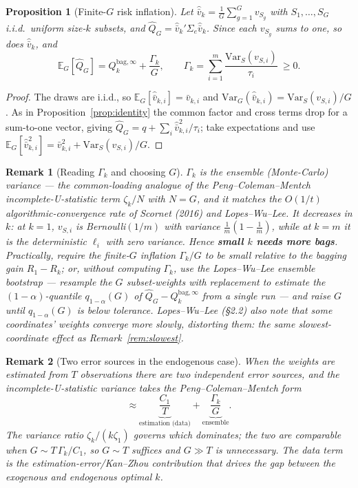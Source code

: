 \documentclass[11pt]{article}
\newcommand{\Sig}{\Sigma_e}
\newcommand{\E}{\mathbb{E}}
\newcommand{\Var}{\mathrm{Var}}
\newtheorem{proposition}{Proposition}
\newtheorem{remark}{Remark}
\begin{document}
\begin{proposition}[Finite-$G$ risk inflation]\label{prop:finiteG}
Let $\hat{\bar v}_k=\frac1G\sum_{g=1}^G v_{S_g}$ with $S_1,\dots,S_G$ i.i.d.\ uniform
size-$k$ subsets, and $\hat Q_G=\hat{\bar v}_k'\Sig\hat{\bar v}_k$. Since each $v_{S_g}$
sums to one, so does $\hat{\bar v}_k$, and
\[
  \E_G[\hat Q_G]=Q_k^{\mathrm{bag},\infty}+\frac{\Gamma_k}{G},\qquad
  \Gamma_k=\sum_{i=1}^m\frac{\Var_S(v_{S,i})}{\tau_i}\ \ge0 .
\]
\end{proposition}
\begin{proof}
The draws are i.i.d., so $\E_G[\hat{\bar v}_{k,i}]=\bar v_{k,i}$ and
$\Var_G(\hat{\bar v}_{k,i})=\Var_S(v_{S,i})/G$. As in
Proposition~\ref{prop:identity} the common factor and cross terms drop for a sum-to-one
vector, giving $\hat Q_G=q+\sum_i\hat{\bar v}_{k,i}^2/\tau_i$; take expectations and use
$\E_G[\hat{\bar v}_{k,i}^2]=\bar v_{k,i}^2+\Var_S(v_{S,i})/G$.
\end{proof}

\begin{remark}[Reading $\Gamma_k$ and choosing $G$]\label{rem:G}
$\Gamma_k$ is the ensemble (Monte-Carlo) variance --- the common-loading analogue of the
Peng--Coleman--Mentch incomplete-U-statistic term $\zeta_k/N$ with $N=G$, and it matches
the $O(1/t)$ algorithmic-convergence rate of Scornet (2016) and Lopes--Wu--Lee. It
\emph{decreases in $k$}: at $k=1$, $v_{S,i}$ is Bernoulli$(1/m)$ with variance
$\tfrac1m(1-\tfrac1m)$, while at $k=m$ it is the deterministic $\ell_i$ with zero variance.
Hence \textbf{small $k$ needs more bags}. Practically, require the finite-$G$ inflation
$\Gamma_k/G$ to be small relative to the bagging gain $R_1-R_k$; or, without computing
$\Gamma_k$, use the Lopes--Wu--Lee \emph{ensemble bootstrap} --- resample the $G$
subset-weights with replacement to estimate the $(1-\alpha)$-quantile $q_{1-\alpha}(G)$ of
$\hat Q_G-Q_k^{\mathrm{bag},\infty}$ from a single run --- and raise $G$ until
$q_{1-\alpha}(G)$ is below tolerance. Lopes--Wu--Lee (\S2.2) also note that some
coordinates' weights converge more slowly, distorting them: the same slowest-coordinate
effect as Remark~\ref{rem:slowest}.
\end{remark}

\begin{remark}[Two error sources in the endogenous case]\label{rem:endoG}
When the weights are estimated from $T$ observations there are two independent error
sources, and the incomplete-U-statistic variance takes the Peng--Coleman--Mentch form
\[
  \approx \underbrace{\frac{C_1}{T}}_{\text{estimation (data)}}
  +\underbrace{\frac{\Gamma_k}{G}}_{\text{ensemble}} .
\]
The variance ratio $\zeta_k/(k\zeta_1)$ governs which dominates; the two are comparable
when $G\sim T\,\Gamma_k/C_1$, so $G\sim T$ suffices and $G\gg T$ is unnecessary. The data
term is the estimation-error/Kan--Zhou contribution that drives the gap between the
exogenous and endogenous optimal $k$.
\end{remark}
\end{document}
